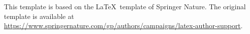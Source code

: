 \documentclass[pdflatex,sn-apacite]{sn-jnl}
\theoremstyle{thmstyleone}%
\theoremstyle{thmstyletwo}%
\theoremstyle{thmstylethree}%
\begin{document}


\mbox{}\thispagestyle{empty}
\cleardoublepage



\thispagestyle{empty}\cleardoublepage



\mbox{}\thispagestyle{empty}
\cleardoublepage
\rmfamily \setcounter{secnumdepth}{4}


\setcounter{page}{1} 
\tableofcontents
\cleardoublepage
{}
{} %



\cleardoublepage
{}
{} %
\listoffigures
\cleardoublepage
{}
{} %
\listoftables
\cleardoublepage

\setcounter{page}{2} 


 
 
\appendix 
 



\clearpage

\markboth{}{}
\vspace*{\fill}
This template is based on the \LaTeX \, template of Springer Nature. The original template is available at \url{https://www.springernature.com/gp/authors/campaigns/latex-author-support}.
\end{document}
